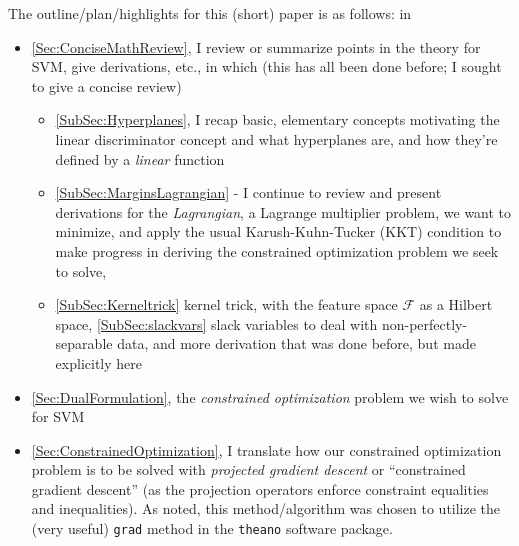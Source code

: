 \documentclass[10pt]{amsart}
\begin{document}
\begin{multicols*}{2}
The outline/plan/highlights for this (short) paper is as follows: in
\begin{itemize}
\item \ref{Sec:ConciseMathReview}, I review or summarize points in the theory for SVM, give derivations, etc., in which (this has all been done before; I sought to give a concise review)
  \begin{itemize}
\item \ref{SubSec:Hyperplanes}, I recap basic, elementary concepts motivating the linear discriminator concept and what hyperplanes are, and how they're defined by a \emph{linear} function
\item \ref{SubSec:MarginsLagrangian} - I continue to review and present derivations for the \emph{Lagrangian}, a Lagrange multiplier problem, we want to minimize, and apply the usual Karush-Kuhn-Tucker (KKT) condition to make progress in deriving the constrained optimization problem we seek to solve,
\item \ref{SubSec:Kerneltrick} kernel trick, with the feature space $\mathcal{F}$ as a Hilbert space, \ref{SubSec:slackvars} slack variables to deal with non-perfectly-separable data, and more derivation that was done before, but made explicitly here
\end{itemize}
\item \ref{Sec:DualFormulation}, the \emph{constrained optimization} problem we wish to solve for SVM
\item \ref{Sec:ConstrainedOptimization}, I translate how our constrained optimization problem is to be solved with \emph{projected gradient descent} or ``constrained gradient descent'' (as the projection operators enforce constraint equalities and inequalities).  As noted, this method/algorithm was chosen to utilize the (very useful) \verb|grad| method in the \verb|theano| software package.


\end{itemize}
\end{multicols*}
\end{document}
